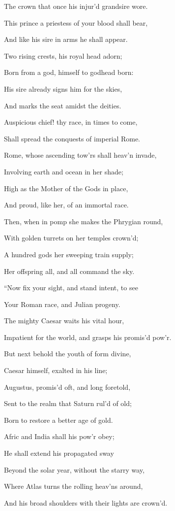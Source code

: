 The crown that once his injur’d grandsire wore.

This prince a priestess of your blood shall bear,

And like his sire in arms he shall appear.

Two rising crests, his royal head adorn;

Born from a god, himself to godhead born:

His sire already signs him for the skies,

And marks the seat amidst the deities.

Auspicious chief! thy race, in times to come,

Shall spread the conquests of imperial Rome.

Rome, whose ascending tow’rs shall heav’n invade,

Involving earth and ocean in her shade;

High as the Mother of the Gods in place,

And proud, like her, of an immortal race.

Then, when in pomp she makes the Phrygian round,

With golden turrets on her temples crown’d;

A hundred gods her sweeping train supply;

Her offspring all, and all command the sky.

“Now fix your sight, and stand intent, to see

Your Roman race, and Julian progeny.

The mighty Caesar waits his vital hour,

Impatient for the world, and grasps his promis’d pow’r.

But next behold the youth of form divine,

Caesar himself, exalted in his line;

Augustus, promis’d oft, and long foretold,

Sent to the realm that Saturn rul’d of old;

Born to restore a better age of gold.

Afric and India shall his pow’r obey;

He shall extend his propagated sway

Beyond the solar year, without the starry way,

Where Atlas turns the rolling heav’ns around,

And his broad shoulders with their lights are crown’d.

